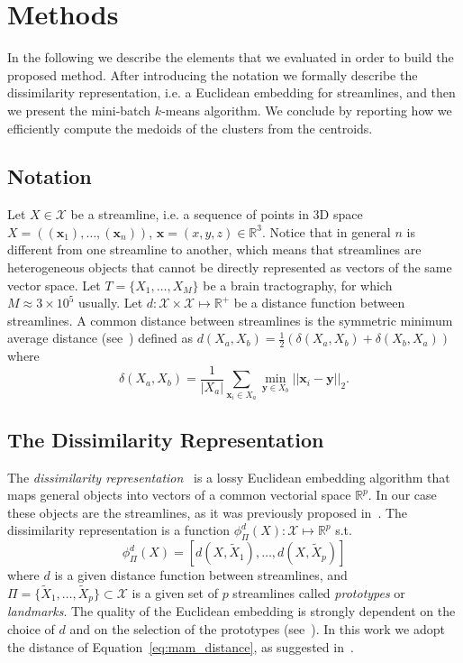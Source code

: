\section{Methods}
\label{sec:methods}
In the following we describe the elements that we evaluated in order
to build the proposed method. After introducing the notation we
formally describe the dissimilarity representation, i.e. a Euclidean
embedding for streamlines, and then we present the mini-batch
$k$-means algorithm. We conclude by reporting how we efficiently
compute the medoids of the clusters from the centroids.

\subsection{Notation}
\label{sec:notation}
Let $X \in \mathcal{X}$ be a streamline, i.e. a sequence of points in
$3$D space $X = \left((\mathbf{x}_1),\ldots,(\mathbf{x}_n)\right)$,
$\mathbf{x} = (x,y,z) \in \mathbb{R}^3$. Notice that in general $n$ is
different from one streamline to another, which means that streamlines
are heterogeneous objects that cannot be directly represented as
vectors of the same vector space. Let $T = \{X_1,\ldots,X_M\}$ be a
brain tractography, for which $M \approx 3 \times 10^5$ usually. Let
$d:\mathcal{X} \times \mathcal{X} \mapsto \mathbb{R}^+$ be a distance
function between streamlines. A common distance between streamlines is
the symmetric minimum average distance
(see~\cite{zhang2008identifying}) defined as $d(X_a,X_b) =
\frac{1}{2}(\delta(X_a,X_b) + \delta(X_b,X_a))$ where
\begin{equation}
  \label{eq:mam_distance}
  \delta(X_a,X_b) = \frac{1}{|X_a|} \sum_{\mathbf{x}_i \in X_a}
    \min_{\mathbf{y} \in X_b} ||\mathbf{x}_i - \mathbf{y}||_2.
\end{equation}



\subsection{The Dissimilarity Representation}
\label{sec:dissimilarity}
The \emph{dissimilarity representation}~\cite{pekalska2002generalized}
is a lossy Euclidean embedding algorithm that maps general objects
into vectors of a common vectorial space $\mathbb{R}^p$. In our case
these objects are the streamlines, as it was previously proposed
in~\cite{olivetti2012approximation}. The dissimilarity representation
is a function $\phi_{\Pi}^d(X):\mathcal{X} \mapsto \mathbb{R}^p$ s.t.
\begin{equation}
  \phi_{\Pi}^d(X) = [d(X,\tilde{X}_1) ,\ldots, d(X,\tilde{X}_p)]
\label{eq:dissimilarity_representation}
\end{equation}
where $d$ is a given distance function between streamlines, and $\Pi =
\{\tilde{X}_1, \ldots, \tilde{X}_p\} \subset \mathcal{X}$ is a given
set of $p$ streamlines called \emph{prototypes} or
\emph{landmarks}. The quality of the Euclidean embedding is strongly
dependent on the choice of $d$ and on the selection of the prototypes
(see~\cite{pekalska2006prototype,olivetti2012approximation}). In this
work we adopt the distance of Equation~\ref{eq:mam_distance}, as
suggested in~\cite{olivetti2012approximation,zhang2008identifying}.

